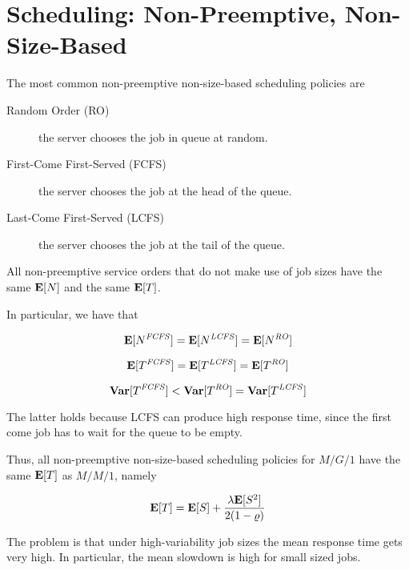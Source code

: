 \section{Scheduling: Non-Preemptive, Non-Size-Based}
\label{sec:Scheduling-Non-Preemptive-Non-Size-Based}

The most common non-preemptive non-size-based scheduling policies are

\begin{description}

	\item [Random Order (RO)] the server chooses the job in queue at random.
	
	\item [First-Come First-Served (FCFS)] the server chooses the job at the head of the queue.
	
	\item [Last-Come First-Served (LCFS)] the server chooses the job at the tail of the queue.

\end{description}

\begin{theorem}
\label{thm:Scheduling--Non-Preemptive-Non-Size-Based}
All non-preemptive service orders that do not make use of job sizes have the same $\mathbf{E}[N]$ and the same $\mathbf{E}[T]$.
\end{theorem}

In particular, we have that

\begin{equation}
\mathbf{E}[N^{\mathit{FCFS}}]=\mathbf{E}[N^{\mathit{LCFS}}]=\mathbf{E}[N^{\mathit{RO}}]
\end{equation}

\begin{equation}
\mathbf{E}[T^{\mathit{FCFS}}]=\mathbf{E}[T^{\mathit{LCFS}}]=\mathbf{E}[T^{\mathit{RO}}]
\end{equation}

\begin{equation}
\mathbf{Var}[T^{\mathit{FCFS}}]<\mathbf{Var}[T^{\mathit{RO}}]=\mathbf{Var}[T^{\mathit{LCFS}}]
\end{equation}

The latter holds because LCFS can produce high response time, since the first come job has to wait for the queue to be empty.

Thus, all non-preemptive non-size-based scheduling policies for $M/G/1$ have the same $\mathbf{E}[T]$ as $M/M/1$, namely

\begin{equation}
\label{eqn:Non-Preemptive-Non-Size-Based-Time}
\expected{T}=\expected{S}+\frac{\lambda\expected{S^{2}}}{2(1-\varrho)}
\end{equation} 

The problem is that under high-variability job sizes the mean response time gets very high.
In particular, the mean slowdown is high for small sized jobs.